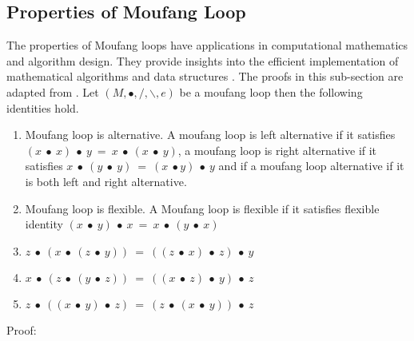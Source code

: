 \subsection{Properties of Moufang Loop}
The properties of Moufang loops have applications in computational mathematics
and algorithm design. They provide insights into the efficient implementation of
mathematical algorithms and data structures \cite{kunen1996moufang}. The proofs
in this sub-section are adapted from \cite{Stener2016MoufangL}. Let $(M, ∙, /,
\backslash, e)$ be a moufang loop then the following identities hold.
\begin{enumerate}
\item Moufang loop is alternative. A moufang loop is left alternative if it
satisfies \((x\ ∙\ x)\ ∙\ y\ =\ x\ ∙\ (x\ ∙\ y)\), a moufang loop is right
alternative if it satisfies \(x\ ∙\ (y\ ∙\ y)\ =\ (x\ ∙ y)\ ∙\ y\) and if a
moufang loop alternative if it is both left and right alternative. 
\item Moufang loop is flexible. A Moufang loop is flexible if it satisfies
flexible identity $(x\ ∙\ y)\ ∙\ x\ =\ x\ ∙\ (y\ ∙\ x)$
\item $z\ ∙\ (x\ ∙\ (z\ ∙\ y))\ =\ ((z\ ∙\ x)\ ∙\ z)\ ∙\ y$
\item $x\ ∙\ (z\ ∙\ (y\ ∙\ z))\ =\ ((x\ ∙\ z)\ ∙\ y)\ ∙\ z$ 
\item $z\ ∙\ ((x\ ∙\ y)\ ∙\ z)\ =\ (z\ ∙ \ (x\ ∙\ y))\ ∙\ z$ 
\end{enumerate}
Proof:
